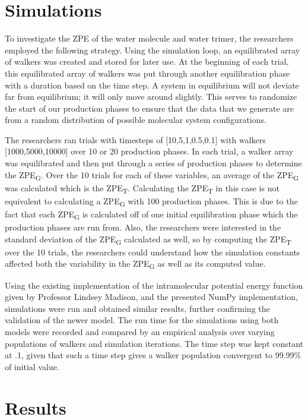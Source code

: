 \documentclass[journal=jacsat,manuscript=article]{achemso}
\begin{document}
\section{Simulations}

To investigate the ZPE of the water molecule and water trimer, the researchers employed the following strategy. Using the simulation loop, an equilibrated array of walkers was created and stored for later use. At the beginning of each trial, this equilibrated array of walkers was put through another equilibration phase with a duration based on the time step. A system in equilibrium will not deviate far from equilibrium; it will only move around slightly. This serves to randomize the start of our production phases to ensure that the data that we generate are from a random distribution of possible molecular system configurations.

The researchers ran trials with timesteps of [10,5,1,0.5,0.1] with walkers [1000,5000,10000] over 10 or 20 production phases. In each trial, a walker array was equilibrated and then put through a series of production phases to determine the ZPE\textsubscript{G}. Over the 10 trials for each of these variables, an average of the ZPE\textsubscript{G} was calculated which is the ZPE\textsubscript{T}. Calculating the ZPE\textsubscript{T} in this case is not equivalent to calculating a ZPE\textsubscript{G} with 100 production phases. This is due to the fact that each ZPE\textsubscript{G} is calculated off of one initial equilibration phase which the production phases are run from. Also, the researchers were interested in the standard deviation of the ZPE\textsubscript{G} calculated as well, so by computing the ZPE\textsubscript{T} over the 10 trials, the researchers could understand how the simulation constants affected both the variability in the ZPE\textsubscript{G} as well as its computed value.

Using the existing implementation of the intramolecular potential energy function given by Professor Lindsey Madison, and the presented NumPy implementation, simulations were run and obtained similar results, further confirming the validation of the newer model. The run time for the simulations using both models were recorded and compared by an empirical analysis over varying populations of walkers and simulation iterations. The time step was kept constant at .1, given that such a time step gives a walker population convergent to 99.99\% of initial value.

\section{Results}
\end{document}
